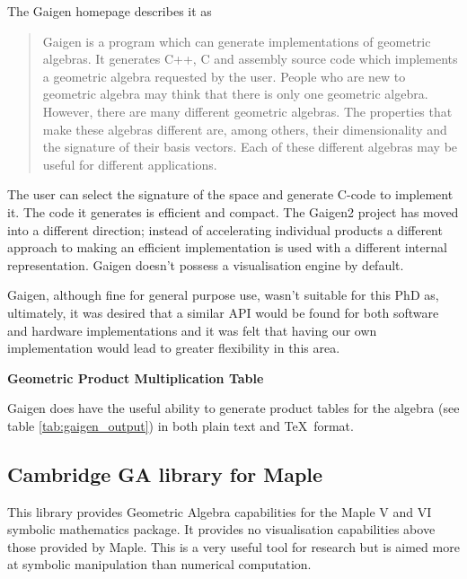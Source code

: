 The Gaigen 
homepage\cite{Gaigen} describes 
it as
\begin{quote}
Gaigen is a program which can generate implementations of geometric algebras. It generates C++, C and assembly source code which implements a geometric algebra requested by the user. People who are new to geometric algebra may think that there is only one geometric algebra. However, there are many different geometric algebras. The properties that make these algebras different are, among others, their dimensionality and the signature of their basis vectors. Each of these different algebras may be useful for different applications.
\end{quote}
The user can select the signature of the space and generate C-code to implement
it. The code it generates is efficient and compact. The Gaigen2 project has
moved into a different direction; instead of accelerating individual products a
different approach to making an efficient implementation is used with a
different internal representation. Gaigen doesn't possess a visualisation
engine by default.

Gaigen, although fine for general purpose use, wasn't suitable for this
PhD as, ultimately, it was desired that a similar API would be found for
both software and hardware implementations and it was felt that having our
own implementation would lead to greater flexibility in this area.

\begin{table}
\centering
\textbf{Geometric Product Multiplication Table}\\
\rule{0cm}{0.3cm}

\caption{Example \TeX\ output from Gaigen\label{tab:gaigen_output}}
\end{table}

Gaigen does have the useful ability to generate product tables for the algebra
(see table \ref{tab:gaigen_output}) in both plain text and \TeX\ format. 

\subsection{Cambridge GA library for Maple}

This library\cite{GA:CambridgeGALibrary} provides Geometric Algebra
capabilities for the Maple V and VI symbolic mathematics package. It provides
no visualisation capabilities above those provided by Maple. This is a very
useful tool for research but is aimed more at symbolic manipulation than
numerical computation.

